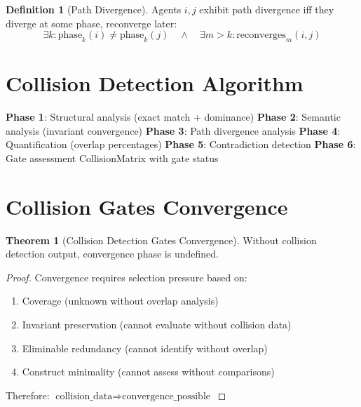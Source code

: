 \documentclass[12pt,oneside,a4paper]{book}
\theoremstyle{definition}
\newtheorem{theorem}{Theorem}[chapter]
\newtheorem{definition}{Definition}[chapter]
\begin{document}
\begin{definition}[Path Divergence]
Agents $i, j$ exhibit path divergence iff they diverge at some phase, reconverge later:
$$\exists k: \text{phase}_k(i) \neq \text{phase}_k(j) \quad \land \quad \exists m > k: \text{reconverges}_m(i,j)$$
\end{definition}

\section{Collision Detection Algorithm}
\label{sec:collision-algorithm}

\begin{algorithm}
\caption{Collision Detection}
\begin{algorithmic}
  \State \textbf{Phase 1}: Structural analysis (exact match + dominance)
  \State \textbf{Phase 2}: Semantic analysis (invariant convergence)
  \State \textbf{Phase 3}: Path divergence analysis
  \State \textbf{Phase 4}: Quantification (overlap percentages)
  \State \textbf{Phase 5}: Contradiction detection
  \State \textbf{Phase 6}: Gate assessment
  \Return CollisionMatrix with gate status
\end{algorithmic}
\end{algorithm}

\section{Collision Gates Convergence}
\label{sec:collision-gates}

\begin{theorem}[Collision Detection Gates Convergence]
Without collision detection output, convergence phase is undefined.

\begin{proof}
Convergence requires selection pressure based on:
\begin{enumerate}
  \item Coverage (unknown without overlap analysis)
  \item Invariant preservation (cannot evaluate without collision data)
  \item Eliminable redundancy (cannot identify without overlap)
  \item Construct minimality (cannot assess without comparisons)
\end{enumerate}

Therefore: $\text{collision\_data} \Rightarrow \text{convergence\_possible}$
\end{proof}
\end{theorem}
\end{document}
